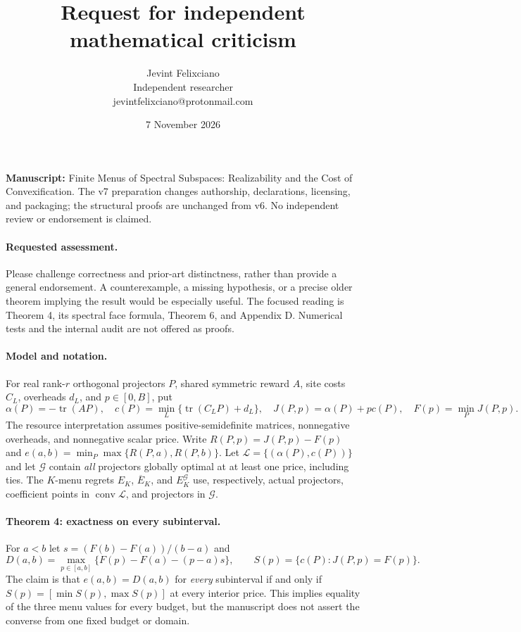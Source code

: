 \documentclass[11pt]{article}
\title{Request for independent mathematical criticism}
\author{Jevint Felixciano\\Independent researcher\\
\small jevintfelixciano@protonmail.com}
\date{7 November 2026}
\begin{document}
\maketitle
\noindent\textbf{Manuscript:} Finite Menus of Spectral Subspaces:
Realizability and the Cost of Convexification. The v7 preparation changes
authorship, declarations, licensing, and packaging; the structural proofs
are unchanged from v6. No independent review or endorsement is claimed.

\paragraph{Requested assessment.}
Please challenge correctness and prior-art distinctness, rather than provide
a general endorsement. A counterexample, a missing hypothesis, or a precise
older theorem implying the result would be especially useful. The focused
reading is Theorem 4, its spectral face formula, Theorem 6, and Appendix D.
Numerical tests and the internal audit are not offered as proofs.

\paragraph{Model and notation.}
For real rank-$r$ orthogonal projectors $P$, shared symmetric reward $A$,
site costs $C_L$, overheads $d_L$, and $p\in[0,B]$, put
\[
 \alpha(P)=-\operatorname{tr}(AP),\quad
 c(P)=\min_L\{\operatorname{tr}(C_LP)+d_L\},\quad
 J(P,p)=\alpha(P)+pc(P),\quad F(p)=\min_PJ(P,p).
\]
The resource interpretation assumes positive-semidefinite matrices,
nonnegative overheads, and nonnegative scalar price. Write
$R(P,p)=J(P,p)-F(p)$ and
$e(a,b)=\min_P\max\{R(P,a),R(P,b)\}$.
Let $\mathcal L=\{(\alpha(P),c(P))\}$ and let $\mathcal G$ contain
\emph{all} projectors globally optimal at at least one price, including ties.
The $K$-menu regrets $E_K$, $\overline E_K$, and $E_K^{\mathcal G}$ use,
respectively, actual projectors, coefficient points in
$\operatorname{conv}\mathcal L$, and projectors in $\mathcal G$.

\paragraph{Theorem 4: exactness on every subinterval.}
For $a<b$ let $s=(F(b)-F(a))/(b-a)$ and
\[
 D(a,b)=\max_{p\in[a,b]}\{F(p)-F(a)-(p-a)s\},\qquad
 S(p)=\{c(P):J(P,p)=F(p)\}.
\]
The claim is that $e(a,b)=D(a,b)$ for \emph{every} subinterval if and
only if $S(p)=[\min S(p),\max S(p)]$ at every interior price.
This implies equality of the three menu values for every budget, but the
manuscript does not assert the converse from one fixed budget or domain.
\end{document}
